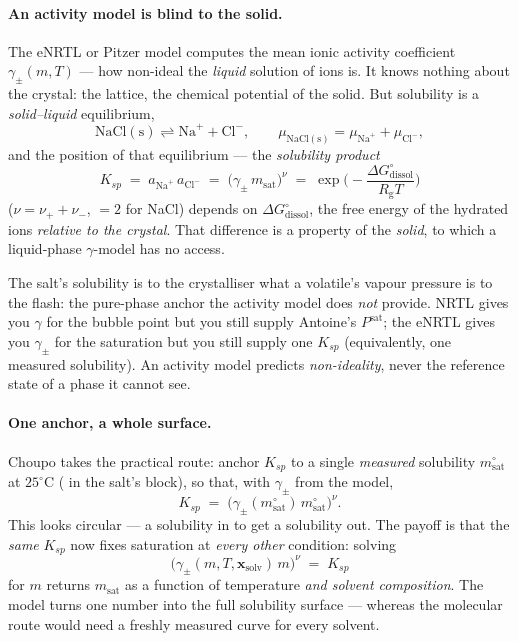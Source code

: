 \documentclass[11pt,a4paper]{article}
\newcommand{\Rgas}{R_{\!\mathrm{g}}}                %
\begin{document}
\paragraph{An activity model is blind to the solid.}  The eNRTL or Pitzer
model computes the mean ionic activity coefficient $\gamma_\pm(m,T)$ ---
how non-ideal the \emph{liquid} solution of ions is.  It knows nothing
about the crystal: the lattice, the chemical potential of the solid.  But
solubility is a \emph{solid--liquid} equilibrium,
\[
   \mathrm{NaCl(s)} \rightleftharpoons \mathrm{Na}^{+}+\mathrm{Cl}^{-},
   \qquad
   \mu_{\mathrm{NaCl(s)}} = \mu_{\mathrm{Na}^{+}} + \mu_{\mathrm{Cl}^{-}},
\]
and the position of that equilibrium --- the \emph{solubility product}
\begin{equation}
   K_{sp} \;=\; a_{\mathrm{Na}^{+}}\,a_{\mathrm{Cl}^{-}}
          \;=\; \big(\gamma_\pm\,m_{\text{sat}}\big)^{\nu}
          \;=\; \exp\!\Big(\!-\frac{\Delta G^{\circ}_{\text{dissol}}}{\Rgas T}\Big)
   \label{eq:ksp}
\end{equation}
($\nu=\nu_{+}+\nu_{-}$, $=2$ for NaCl) depends on
$\Delta G^{\circ}_{\text{dissol}}$, the free energy of the hydrated ions
\emph{relative to the crystal}.  That difference is a property of the
\emph{solid}, to which a liquid-phase $\gamma$-model has no access.

\begin{intuition}
The salt's solubility is to the crystalliser what a volatile's vapour
pressure is to the flash: the pure-phase anchor the activity model does
\emph{not} provide.  NRTL gives you $\gamma$ for the bubble point but you
still supply Antoine's $P^{\text{sat}}$; the eNRTL gives you $\gamma_\pm$
for the saturation but you still supply one $K_{sp}$ (equivalently, one
measured solubility).  An activity model predicts \emph{non-ideality},
never the reference state of a phase it cannot see.
\end{intuition}

\paragraph{One anchor, a whole surface.}  Choupo takes the practical
route: anchor $K_{sp}$ to a single \emph{measured} solubility
$m_{\text{sat}}^{\circ}$ at $25^{\circ}$C ( in the
salt's  block), so that, with $\gamma_\pm$ from the
model,
\begin{equation}
   K_{sp} \;=\; \big(\gamma_\pm(m_{\text{sat}}^{\circ})\,
                      m_{\text{sat}}^{\circ}\big)^{\nu}.
\end{equation}
This looks circular --- a solubility in to get a solubility out.  The
payoff is that the \emph{same} $K_{sp}$ now fixes saturation at
\emph{every other} condition: solving
\begin{equation}
   \big(\gamma_\pm(m,T,\mathbf{x}_{\text{solv}})\,m\big)^{\nu} \;=\; K_{sp}
   \label{eq:msat-solve}
\end{equation}
for $m$ returns $m_{\text{sat}}$ as a function of temperature \emph{and
solvent composition}.  The model turns one number into the full solubility
surface --- whereas the molecular route would need a freshly measured
curve for every solvent.
\end{document}
